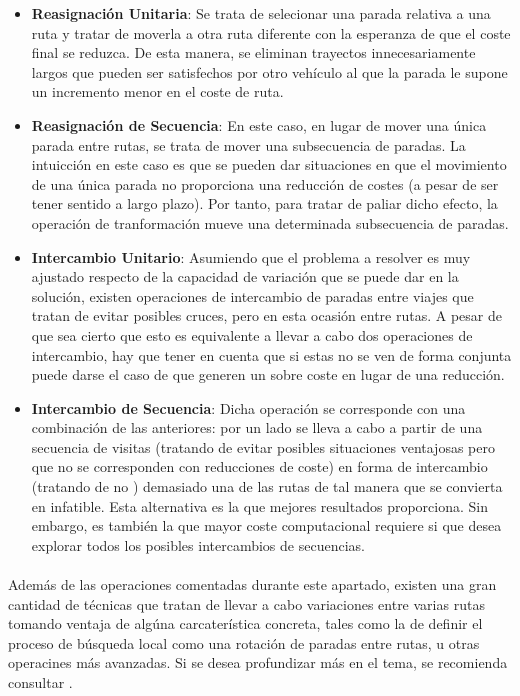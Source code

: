 \documentclass{subfiles}
\begin{document}
          \begin{itemize}

            \item \textbf{Reasignación Unitaria}: Se trata de selecionar una parada relativa a una ruta y tratar de moverla a otra ruta diferente con la esperanza de que el coste final se reduzca. De esta manera, se eliminan trayectos innecesariamente largos que pueden ser satisfechos por otro vehículo al que la parada le supone un incremento menor en el coste de ruta.

            \item \textbf{Reasignación de Secuencia}: En este caso, en lugar de mover una única parada entre rutas, se trata de mover una subsecuencia de paradas. La intuicción en este caso es que se pueden dar situaciones en que el movimiento de una única parada no proporciona una reducción de costes (a pesar de ser tener sentido a largo plazo). Por tanto, para tratar de paliar dicho efecto, la operación de tranformación mueve una determinada subsecuencia de paradas.

            \item \textbf{Intercambio Unitario}: Asumiendo que el problema a resolver es muy ajustado respecto de la capacidad de variación que se puede dar en la solución, existen operaciones de intercambio de paradas entre viajes que tratan de evitar posibles cruces, pero en esta ocasión entre rutas. A pesar de que sea cierto que esto es equivalente a llevar a cabo dos operaciones de intercambio, hay que tener en cuenta que si estas no se ven de forma conjunta puede darse el caso de que generen un sobre coste en lugar de una reducción.

            \item \textbf{Intercambio de Secuencia}: Dicha operación se corresponde con una combinación de las anteriores: por un lado se lleva a cabo a partir de una secuencia de visitas (tratando de evitar posibles situaciones ventajosas pero que no se corresponden con reducciones de coste) en forma de intercambio (tratando de no ) demasiado una de las rutas de tal manera que se convierta en infatible. Esta alternativa es la que mejores resultados proporciona. Sin embargo, es también la que mayor coste computacional requiere si que desea explorar todos los posibles intercambios de secuencias.

          \end{itemize}

          \paragraph{}
          Además de las operaciones comentadas durante este apartado, existen una gran cantidad de técnicas que tratan de llevar a cabo variaciones entre varias rutas tomando ventaja de algúna carcaterística concreta, tales como la de definir el proceso de búsqueda local como una rotación de paradas entre rutas, u otras operacines más avanzadas. Si se desea profundizar más en el tema, se recomienda consultar \cite{funke2005local}.
\end{document}
